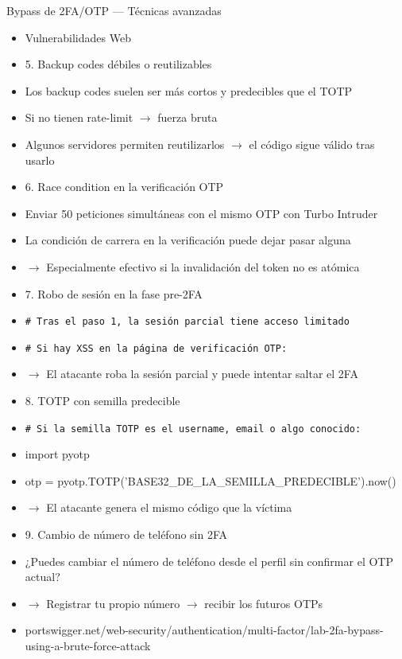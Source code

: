 \documentclass[aspectratio=169,10pt]{beamer}
\newcommand{\cmd}[1]{\texttt{\color{uznavy}#1}}
\begin{document}
\begin{frame}[allowframebreaks]{Bypass de 2FA/OTP --- Técnicas avanzadas}
\small
  \begin{itemize}
  \item Vulnerabilidades Web
  \item 5. Backup codes débiles o reutilizables
  \item Los backup codes suelen ser más cortos y predecibles que el TOTP
  \item Si no tienen rate-limit $\rightarrow$ fuerza bruta
  \item Algunos servidores permiten reutilizarlos $\rightarrow$ el código sigue válido tras usarlo
  \item 6. Race condition en la verificación OTP
  \item Enviar 50 peticiones simultáneas con el mismo OTP con Turbo Intruder
  \item La condición de carrera en la verificación puede dejar pasar alguna
  \item $\rightarrow$ Especialmente efectivo si la invalidación del token no es atómica
  \item 7. Robo de sesión en la fase pre-2FA
  \item \cmd{\# Tras el paso 1, la sesión parcial tiene acceso limitado}
  \item \cmd{\# Si hay XSS en la página de verificación OTP:}
  \item $\rightarrow$ El atacante roba la sesión parcial y puede intentar saltar el 2FA
  \item 8. TOTP con semilla predecible
  \item \cmd{\# Si la semilla TOTP es el username, email o algo conocido:}
  \item import pyotp
  \item otp = pyotp.TOTP('BASE32\_DE\_LA\_SEMILLA\_PREDECIBLE').now()
  \item $\rightarrow$ El atacante genera el mismo código que la víctima
  \item 9. Cambio de número de teléfono sin 2FA
  \item ¿Puedes cambiar el número de teléfono desde el perfil sin confirmar el OTP actual?
  \item $\rightarrow$ Registrar tu propio número $\rightarrow$ recibir los futuros OTPs
  \item portswigger.net/web-security/authentication/multi-factor/lab-2fa-bypass-using-a-brute-force-attack
  \end{itemize}
\end{frame}
\end{document}
